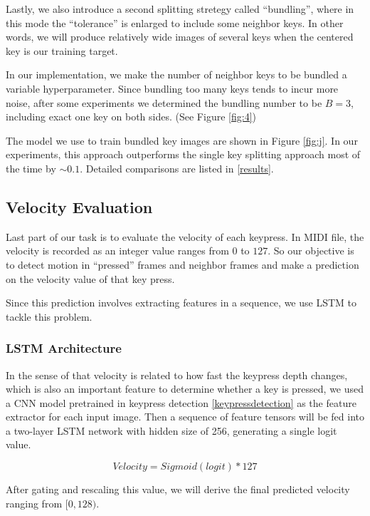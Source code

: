 \documentclass[10pt,twocolumn,letterpaper]{article}
\begin{document}
Lastly, we also introduce a second splitting stretegy called ``bundling'', where in this mode the ``tolerance'' is enlarged to include some neighbor keys.
In other words, we will produce relatively wide images of several keys when the centered key is our training target. 

In our implementation, we make the number of neighbor keys to be bundled a variable hyperparameter. 
Since bundling too many keys tends to incur more noise, after some experiments we determined the bundling number to be $B = 3$, including exact one key on both sides. (See Figure \ref{fig:4})

The model we use to train bundled key images are shown in Figure \ref{fig:j}. In our experiments, this approach outperforms the single key splitting approach most of the time by \(\sim 0.1\). Detailed comparisons are listed in \ref{results}.

\subsection{Velocity Evaluation}

   Last part of our task is to evaluate the velocity of each keypress. 
   In MIDI file, the velocity is recorded as an integer value ranges from $0$ to $127$. 
   So our objective is to detect motion in ``pressed'' frames and neighbor frames and make a prediction on the velocity value of that key press.
   
   Since this prediction involves extracting features in a sequence, we use LSTM to tackle this problem. 
   
   \subsubsection{LSTM Architecture}

   In the sense of that velocity is related to how fast the keypress depth changes, which is also an important feature to determine whether a key is pressed, we used a CNN model pretrained in keypress detection \ref{keypressdetection} as the feature extractor for each input image. Then a sequence of feature tensors will be fed into a two-layer LSTM network with hidden size of 256, generating a single logit value.
   
   \[Velocity = Sigmoid(logit) * 127\]
   
After gating and rescaling this value, we will derive the final predicted velocity ranging from \([0, 128)\).
\end{document}

